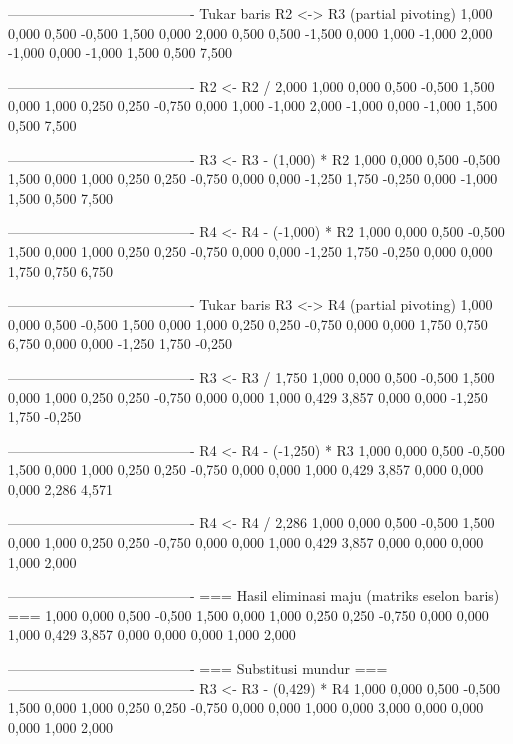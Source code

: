 \documentclass[12pt]{article}
\begin{document}
\begin{enumerate}
\begin{keluaran}
----------------------------------------
Tukar baris R2 <-> R3 (partial pivoting)
1,000   0,000   0,500   -0,500  1,500
0,000   2,000   0,500   0,500   -1,500
0,000   1,000   -1,000  2,000   -1,000
0,000   -1,000  1,500   0,500   7,500

----------------------------------------
R2 <- R2 / 2,000
1,000   0,000   0,500   -0,500  1,500
0,000   1,000   0,250   0,250   -0,750
0,000   1,000   -1,000  2,000   -1,000
0,000   -1,000  1,500   0,500   7,500

----------------------------------------
R3 <- R3 - (1,000) * R2
1,000   0,000   0,500   -0,500  1,500
0,000   1,000   0,250   0,250   -0,750
0,000   0,000   -1,250  1,750   -0,250
0,000   -1,000  1,500   0,500   7,500

----------------------------------------
R4 <- R4 - (-1,000) * R2
1,000   0,000   0,500   -0,500  1,500
0,000   1,000   0,250   0,250   -0,750
0,000   0,000   -1,250  1,750   -0,250
0,000   0,000   1,750   0,750   6,750

----------------------------------------
Tukar baris R3 <-> R4 (partial pivoting)
1,000   0,000   0,500   -0,500  1,500
0,000   1,000   0,250   0,250   -0,750
0,000   0,000   1,750   0,750   6,750
0,000   0,000   -1,250  1,750   -0,250

----------------------------------------
R3 <- R3 / 1,750
1,000   0,000   0,500   -0,500  1,500
0,000   1,000   0,250   0,250   -0,750
0,000   0,000   1,000   0,429   3,857
0,000   0,000   -1,250  1,750   -0,250

----------------------------------------
R4 <- R4 - (-1,250) * R3
1,000   0,000   0,500   -0,500  1,500
0,000   1,000   0,250   0,250   -0,750
0,000   0,000   1,000   0,429   3,857
0,000   0,000   0,000   2,286   4,571

----------------------------------------
R4 <- R4 / 2,286
1,000   0,000   0,500   -0,500  1,500
0,000   1,000   0,250   0,250   -0,750
0,000   0,000   1,000   0,429   3,857
0,000   0,000   0,000   1,000   2,000

----------------------------------------
=== Hasil eliminasi maju (matriks eselon baris) ===
1,000   0,000   0,500   -0,500  1,500
0,000   1,000   0,250   0,250   -0,750
0,000   0,000   1,000   0,429   3,857
0,000   0,000   0,000   1,000   2,000

----------------------------------------
=== Substitusi mundur ===
----------------------------------------
R3 <- R3 - (0,429) * R4
1,000   0,000   0,500   -0,500  1,500
0,000   1,000   0,250   0,250   -0,750
0,000   0,000   1,000   0,000   3,000
0,000   0,000   0,000   1,000   2,000


\end{keluaran}
\end{enumerate}
\end{document}

